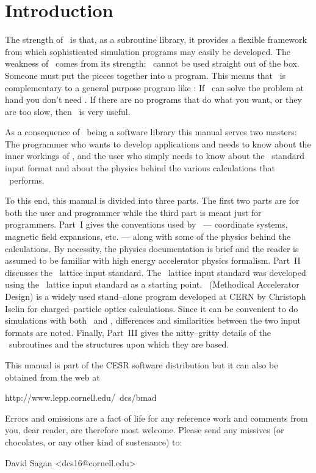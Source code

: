 \section*{Introduction}

The strength of \bmad\ is that, as a subroutine library, it provides a
flexible framework from which sophisticated simulation programs may
easily be developed.  The weakness of \bmad\ comes from its strength:
\bmad\ cannot be used straight out of the box. Someone must put the
pieces together into a program. This means that \bmad\ is
complementary to a general purpose program like
\mad\cite{b:maduser,b:madphysics}: If \mad\ can solve the problem at
hand you don't need \bmad. If there are no programs that do what you
want, or they are too slow, then \bmad\ is very useful.

As a consequence of \bmad\ being a software library this manual serves
two masters: The programmer who wants to develop applications and
needs to know about the inner workings of \bmad, and the user who
simply needs to know about the \bmad\ standard input format and about
the physics behind the various calculations that \bmad\ performs.

To this end, this manual is divided into three parts. The first two
parts are for both the user and programmer while the third part is
meant just for programmers. Part~I gives the conventions used by
\bmad\ --- coordinate systems, magnetic field expansions, etc. ---
along with some of the physics behind the calculations. By necessity,
the physics documentation is brief and the reader is assumed to be familiar
with high energy accelerator physics formalism. Part~II discusses the
\bmad\ lattice input standard.  The \bmad\ lattice input standard was
developed using the \mad\ lattice input standard as a starting
point. \mad\ (Methodical Accelerator Design) is a widely used
stand--alone program developed at CERN by Christoph Iselin for
charged--particle optics calculations. Since it can be convenient
to do simulations with both \mad\ and \bmad, differences and
similarities between the two input formats are noted. 
Finally, Part~III gives the nitty--gritty details of the \bmad\
subroutines and the structures upon which they are based.

This manual is part of the 
CESR software distribution but it can also be obtained from the web at
\begin{example}
  http://www.lepp.cornell.edu/~dcs/bmad
\end{example}

Errors and omissions are a fact of life for any reference work and
comments from you, dear reader, are therefore most welcome. Please
send any missives (or chocolates, or any other kind of sustenance) to:
\begin{example}
  David Sagan <dcs16@cornell.edu>
\end{example}
